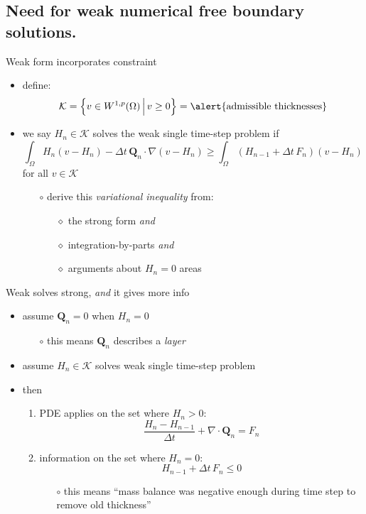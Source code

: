\documentclass{beamer}
\newcommand\bQ{\mathbf{Q}}
\newcommand{\Div}{\nabla\cdot}
\newcommand{\grad}{\nabla}
\begin{document}
\subsection{Need for weak numerical free boundary solutions.}

\begin{frame}{Weak form incorporates constraint}

  \begin{itemize}
  \item define:
    $$\mathcal{K} = \left\{v \in W^{1,p}(\Omega) \,\Big|\, v\ge 0\right\} = \text{\alert{admissible thicknesses}}$$
  \item we say $H_n \in \mathcal{K}$ solves the \alert{weak single time-step problem} if
    $$\int_\Omega H_n (v - H_n) - \Delta t\, \bQ_n \cdot \grad(v - H_n) \ge \int_\Omega \left(H_{n-1} + \Delta t\, F_n\right) (v - H_n)$$
  for all $v \in \mathcal{K}$
  \small
  \medskip
    \begin{itemize}
    \item[$\circ$] derive this \emph{variational inequality} from:
      \begin{itemize}
      \item[$\diamond$] the strong form \emph{and}
      \item[$\diamond$] integration-by-parts \emph{and}
      \item[$\diamond$] arguments about $H_n=0$ areas
      \end{itemize}
    \end{itemize}
  \end{itemize}
\end{frame}


\begin{frame}{Weak solves strong, \emph{and} it gives more info}

\begin{itemize}
  \item assume $\bQ_n=0$ when $H_n=0$
    \begin{itemize}
    \item[$\circ$] this means $\bQ_n$ describes a \emph{layer}
    \end{itemize}
  \item assume $H_n \in \mathcal{K}$ solves weak single time-step problem
  \item then
	  \begin{enumerate}
	  \item PDE applies on the set where $H_n>0$:
	    $$\frac{H_n - H_{n-1}}{\Delta t} + \Div \bQ_n = F_n$$
	  \item information on the set where $H_n = 0$:
	    $$H_{n-1} + \Delta t\, F_n \le 0$$
	    \vspace{-6mm}
	    \begin{itemize}
	    \item[$\circ$] this means ``mass balance was negative enough during time step to remove old thickness''
	    \end{itemize}
	  \end{enumerate}
\end{itemize}
\end{frame}
\end{document}
